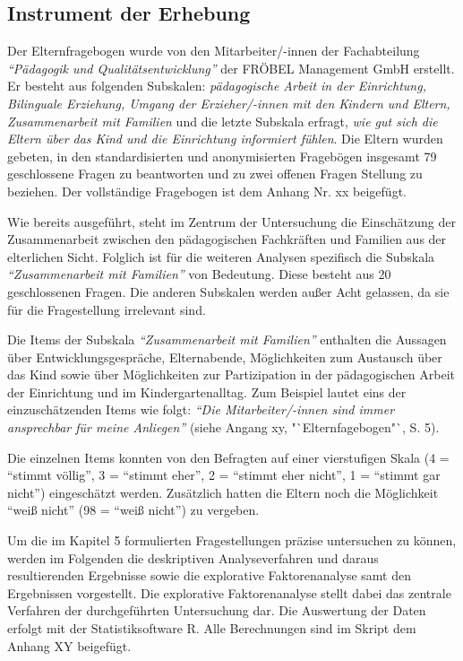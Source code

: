 \documentclass[12pt,a4paper]{article}
\begin{document}
\subsection{Instrument der Erhebung} 
Der Elternfragebogen wurde von den Mitarbeiter/-innen der Fachabteilung \textit{"`Pä\-da\-go\-gik und Qualitätsentwicklung"'} der FRÖBEL Management GmbH erstellt. Er besteht aus folgenden Subskalen: \textit{pädagogische Arbeit in der Einrichtung, Bilinguale Erziehung, Umgang der Erzieher/-innen mit den Kindern und Eltern, Zusammenarbeit mit Familien} und die letzte Subskala erfragt, \textit{wie gut sich die Eltern über das Kind und die Einrichtung informiert fühlen}. Die Eltern wurden gebeten, in den standardisierten und anonymisierten Fragebögen insgesamt 79 geschlossene Fragen zu beantworten und zu zwei offenen Fragen Stellung zu beziehen. Der vollständige Fragebogen ist dem Anhang Nr. xx beigefügt.

	Wie bereits ausgeführt, steht im Zentrum der Untersuchung die Einschätzung der Zusammenarbeit zwischen den pädagogischen Fachkräften und Familien aus der elterlichen Sicht. Folglich ist für die weiteren Analysen spezifisch die Subskala \textit{"`Zusammenarbeit mit Familien"'} von Bedeutung. Diese besteht aus 20 geschlossenen Fragen. Die anderen Subskalen werden außer Acht gelassen, da sie für die Fragestellung irrelevant sind.
	
	Die Items der Subskala \textit{"`Zusammenarbeit mit Familien"'} enthalten die Aussagen über Entwicklungsgespräche, Elternabende, Möglichkeiten zum Austausch über das Kind sowie über Möglichkeiten zur Partizipation in der pädagogischen Arbeit der Einrichtung und im Kindergartenalltag. Zum Beispiel lautet eins der einzuschätzenden Items wie folgt: \textit{"`Die Mitarbeiter/-innen sind immer ansprechbar für meine Anliegen"'} (siehe Angang xy, "`Elternfagebogen"`, S. 5).
	
	Die einzelnen Items konnten von den Befragten auf einer vierstufigen Skala (4 = "`stimmt völlig"', 3 = "`stimmt eher"', 2 = "`stimmt eher nicht"', 1 = "`stimmt gar nicht"') eingeschätzt werden. Zusätzlich hatten die Eltern noch die Möglichkeit "`weiß nicht"' (98 = "`weiß nicht"') zu vergeben.
	   
	Um die im Kapitel 5 formulierten Fragestellungen präzise untersuchen zu können, werden im Folgenden die deskriptiven Analyseverfahren und daraus resultierenden Ergebnisse sowie die explorative Faktorenanalyse samt den Ergebnissen vorgestellt. Die explorative Faktorenanalyse stellt dabei das zentrale Verfahren der durchgeführten Untersuchung dar. Die Auswertung der Daten erfolgt mit der Statistiksoftware R. Alle Berechnungen sind im Skript dem Anhang XY beigefügt.
\end{document}
